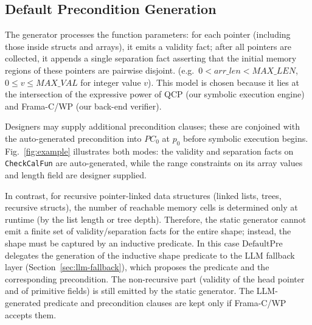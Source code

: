 \subsection{Default Precondition Generation}
\label{sec:default-pre}

The generator processes the function parameters: for each pointer (including those inside structs and arrays), it emits a validity fact; after all pointers are collected, it appends a single separation fact asserting that the initial memory regions of these pointers are pairwise disjoint.  (e.g.\ $0 < \mathit{arr\_len} < \mathit{MAX\_LEN}$, $0 \le v \le \mathit{MAX\_VAL}$ for integer value $v$). This model is chosen because it lies at the intersection of the expressive power of QCP (our symbolic execution engine) and Frama-C/WP (our back-end verifier). 



Designers may supply additional precondition clauses; these are conjoined with the auto-generated precondition into $PC_0$ at $p_0$ before symbolic execution begins. Fig.~\ref{fig:example} illustrates both modes: the validity and separation facts on \texttt{CheckCalFun} are auto-generated, while the range constraints on its array values and length field are designer supplied.

In contrast, for recursive pointer-linked data structures (linked lists, trees, recursive structs), the number of reachable memory cells is determined only at runtime (by the list length or tree depth). Therefore, the static generator cannot emit a finite set of validity/separation facts for the entire shape; instead, the shape must be captured by an inductive predicate. In this case $\mathrm{DefaultPre}$ delegates the generation of the inductive shape predicate to the LLM fallback layer (Section~\ref{sec:llm-fallback}), which proposes the predicate and the corresponding precondition. The non-recursive part (validity of the head pointer and of primitive fields) is still emitted by the static generator. The LLM-generated predicate and precondition clauses are kept only if Frama-C/WP accepts them.

 
